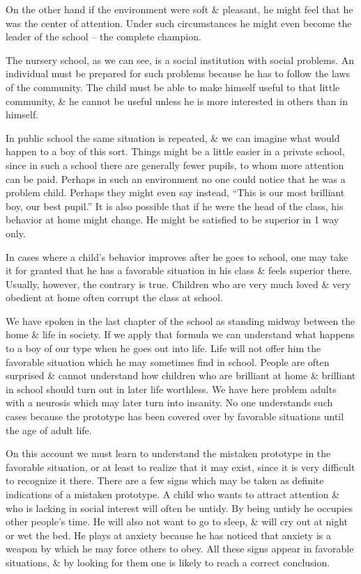 \documentclass{article}
\begin{document}
On the other hand if the environment were soft \& pleasant, he might feel that he was the center of attention. Under such circumstances he might even become the leader of the school -- the complete champion.

The nursery school, as we can see, is a social institution with social problems. An individual must be prepared for such problems because he has to follow the laws of the community. The child must be able to make himself useful to that little community, \& he cannot be useful unless he is more interested in others than in himself.

In public school the same situation is repeated, \& we can imagine what would happen to a boy of this sort. Things might be a little easier in a private school, since in such a school there are generally fewer pupils, to whom more attention can be paid. Perhaps in such an environment no one could notice that he was a problem child. Perhaps they might even say instead, ``This is our most brilliant boy, our best pupil.'' It is also possible that if he were the head of the class, his behavior at home might change. He might be satisfied to be superior in 1 way only.

In cases where a child's behavior improves after he goes to school, one may take it for granted that he has a favorable situation in his class \& feels superior there. Usually, however, the contrary is true. Children who are very much loved \& very obedient at home often corrupt the class at school.

We have spoken in the last chapter of the school as standing midway between the home \& life in society. If we apply that formula we can understand what happens to a boy of our type when he goes out into life. Life will not offer him the favorable situation which he may sometimes find in school. People are often surprised \& cannot understand how children who are brilliant at home \& brilliant in school should turn out in later life worthless. We have here problem adults with a neurosis which may later turn into insanity. No one understands such cases because the prototype has been covered over by favorable situations until the age of adult life.

On this account we must learn to understand the mistaken prototype in the favorable situation, or at least to realize that it may exist, since it is very difficult to recognize it there. There are a few signs which may be taken as definite indications of a mistaken prototype. A child who wants to attract attention \& who is lacking in social interest will often be untidy. By being untidy he occupies other people's time. He will also not want to go to sleep, \& will cry out at night or wet the bed. He plays at anxiety because he has noticed that anxiety is a weapon by which he may force others to obey. All these signs appear in favorable situations, \& by looking for them one is likely to reach a correct conclusion.
\end{document}
